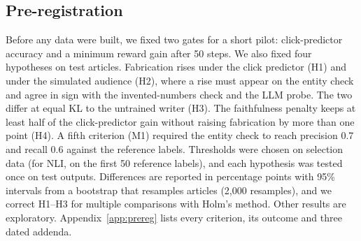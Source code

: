 \subsection{Pre-registration}\label{sec:prereg}
Before any data were built, we fixed two gates for a short pilot: click-predictor accuracy and a minimum reward gain after 50 steps. We also fixed four hypotheses on test articles. Fabrication rises under the click predictor (H1) and under the simulated audience (H2), where a rise must appear on the entity check and agree in sign with the invented-numbers check and the LLM probe. The two differ at equal KL to the untrained writer (H3). The faithfulness penalty keeps at least half of the click-predictor gain without raising fabrication by more than one point (H4). A fifth criterion (M1) required the entity check to reach precision 0.7 and recall 0.6 against the reference labels. Thresholds were chosen on selection data (for NLI, on the first 50 reference labels), and each hypothesis was tested once on test outputs. Differences are reported in percentage points with 95\% intervals from a bootstrap that resamples articles (2,000 resamples), and we correct H1--H3 for multiple comparisons with Holm's method. Other results are exploratory. Appendix~\ref{app:prereg} lists every criterion, its outcome and three dated addenda.

